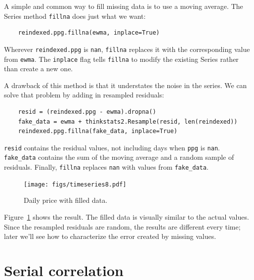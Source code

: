 \documentclass[12pt]{book}
\theoremstyle{exercise}
\begin{document}
A simple and common way to fill missing data is to use a moving
average.  The Series method {\tt fillna} does just what we want:%
%

\begin{verbatim}
    reindexed.ppg.fillna(ewma, inplace=True)
\end{verbatim}

Wherever {\tt reindexed.ppg} is {\tt nan}, {\tt fillna} replaces
it with the corresponding value from {\tt ewma}.  The {\tt inplace}
flag tells {\tt fillna} to modify the existing Series rather than
create a new one.

A drawback of this method is that it understates the noise in the
series.  We can solve that problem by adding in resampled
residuals:%
%

\begin{verbatim}
    resid = (reindexed.ppg - ewma).dropna()
    fake_data = ewma + thinkstats2.Resample(resid, len(reindexed))
    reindexed.ppg.fillna(fake_data, inplace=True)
\end{verbatim}


{\tt resid} contains the residual values, not including days
when {\tt ppg} is {\tt nan}.  \verb"fake_data" contains the
sum of the moving average and a random sample of residuals.
Finally, {\tt fillna} replaces {\tt nan} with values from
\verb"fake_data".%
%
%

\begin{figure}
\centerline{\texttt{[image: figs/timeseries8.pdf]}}
\caption{Daily price with filled data.}%
\label{timeseries8}
\end{figure}

Figure~\ref{timeseries8} shows the result.  The filled data is visually
similar to the actual values.  Since the resampled residuals are
random, the results are different every time; later we'll see how
to characterize the error created by missing values.%
%


\section{Serial correlation}
\end{document}
